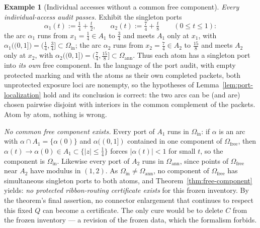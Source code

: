 \documentclass[11pt,reqno]{amsart}
\theoremstyle{definition}
\newtheorem{example}[theorem]{Example}
\theoremstyle{remark}
\newcommand{\Omfree}{\Omega_{\mathrm{free}}}
\begin{document}
\begin{example}[Individual accesses without a common free component]
\emph{Every individual-access audit passes.} Exhibit the singleton ports
\[
\alpha_1(t):=\tfrac14+\tfrac t2,
\qquad
\alpha_2(t):=\tfrac74+\tfrac t8
\qquad(0\le t\le1):
\]
the arc $\alpha_1$ runs from $x_1=\tfrac14\in A_1$ to $\tfrac34$ and meets $A_1$ only at
$x_1$, with $\alpha_1\bigl((0,1]\bigr)=(\tfrac14,\tfrac34]\subset\Omega_{\mathrm{in}}$;
the arc $\alpha_2$ runs from $x_2=\tfrac74\in A_2$ to $\tfrac{15}8$ and meets $A_2$ only
at $x_2$, with
$\alpha_2\bigl((0,1]\bigr)=(\tfrac74,\tfrac{15}8]\subset\Omega_{\mathrm{ann}}$. Thus
each atom has a singleton port into \emph{its own} free component. In the language of
the port audit, with empty protected marking and with the atoms as their own completed
packets, both unprotected exposure loci are nonempty, so the hypotheses of
Lemma~\ref{lem:port-localization} hold and its conclusion is correct: the two arcs can
be (and are) chosen pairwise disjoint with interiors in the common complement of the
packets. Atom by atom, nothing is wrong.

\emph{No common free component exists.} Every port of $A_1$ runs in
$\Omega_{\mathrm{in}}$: if $\alpha$ is an arc with
$\alpha\cap A_1=\{\alpha(0)\}$ and $\alpha((0,1])$ contained in one component of
$\Omfree$, then $\alpha(t)\to\alpha(0)\in A_1\subset\{|z|\le\tfrac14\}$ forces
$|\alpha(t)|<1$ for small $t$, so the component is $\Omega_{\mathrm{in}}$. Likewise
every port of $A_2$ runs in $\Omega_{\mathrm{ann}}$, since points of $\Omfree$ near
$A_2$ have modulus in $(1,2)$. As $\Omega_{\mathrm{in}}\neq\Omega_{\mathrm{ann}}$, no
component of $\Omfree$ has simultaneous singleton ports to both atoms, and
Theorem~\ref{thm:free-component} yields: \emph{no protected ribbon-routing certificate
exists} for this frozen inventory.  By the theorem's final assertion, no
connector enlargement that continues to respect this fixed $Q$ can become a
certificate.  The only cure
would be to delete $C$ from the frozen inventory --- a revision of the frozen data,
which the formalism forbids.
\end{example}
\end{document}

